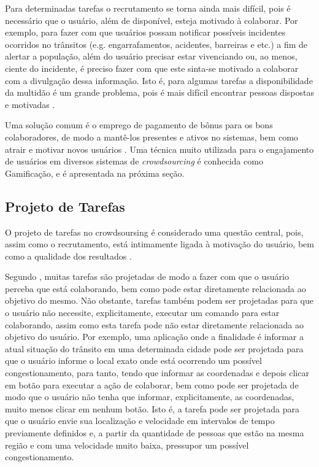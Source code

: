 Para determinadas tarefas o recrutamento se torna ainda mais difícil, pois é necessário que o usuário, além de disponível, esteja motivado à colaborar. Por exemplo,  para fazer com que usuários possam notificar possíveis incidentes ocorridos no trânsitos (e.g. engarrafamentos, acidentes, barreiras e etc.) a fim de alertar a população, além do usuário precisar estar vivenciando ou, ao menos, ciente do incidente, é preciso fazer com que este sinta-se motivado a colaborar com a divulgação dessa informação.  Isto é, para algumas tarefas a disponibilidade da multidão é um grande problema, pois é mais difícil encontrar pessoas dispostas e motivadas \citep{Hu2012}. 

Uma solução comum é o emprego de pagamento de bônus para os bons colaboradores, de modo a mantê-los presentes e ativos no sistemas, bem como atrair e motivar novos usuários \citep{Hu2012}. Uma técnica muito utilizada para o engajamento de usuários em diversos sistemas de \textit{crowdsourcing} é conhecida como Gamificação, e é apresentada na próxima seção.   


\subsection{Projeto de Tarefas}
O projeto  de tarefas no crowdsoursing é considerado uma questão central, pois, assim como o recrutamento, está intimamente ligada à motivação do usuário, bem como a qualidade dos resultados \citep{Hu2012}. 

Segundo \cite{Hu2012}, muitas tarefas são projetadas de modo a fazer com que o usuário perceba que está colaborando, bem como pode estar diretamente relacionada ao objetivo do mesmo. Não obstante, tarefas também podem ser projetadas para que o usuário não necessite, explicitamente, executar um comando para estar colaborando, assim como esta tarefa pode não estar diretamente relacionada ao objetivo do usuário. Por exemplo, uma aplicação onde a finalidade é informar a atual situação do trânsito em uma determinada cidade pode ser projetada para que o usuário informe o local exato onde está ocorrendo um possível congestionamento, para tanto, tendo que informar as coordenadas e depois clicar em botão para executar a ação de colaborar, bem como pode ser projetada de modo que o usuário não tenha que informar, explicitamente, as coordenadas, muito menos clicar em nenhum botão. Isto é, a tarefa pode ser projetada para que o usuário envie sua localização e velocidade em intervalos de tempo previamente definidos e, a partir da quantidade de pessoas que estão na mesma região e com uma velocidade muito baixa, pressupor um possível congestionamento. 

